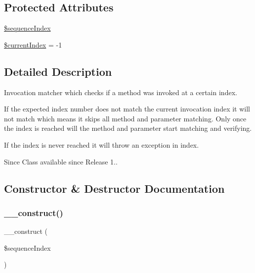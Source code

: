 \subsection*{Protected Attributes}
\begin{DoxyCompactItemize}
\item 
\mbox{\hyperlink{class_p_h_p_unit___framework___mock_object___matcher___invoked_at_index_ad1a376b0d5f560966a0fbf2ac6a57e33}{\$sequence\+Index}}
\item 
\mbox{\hyperlink{class_p_h_p_unit___framework___mock_object___matcher___invoked_at_index_a2c9d194ca07429b0b27d89f5efe150de}{\$current\+Index}} = -\/1
\end{DoxyCompactItemize}


\subsection{Detailed Description}
Invocation matcher which checks if a method was invoked at a certain index.

If the expected index number does not match the current invocation index it will not match which means it skips all method and parameter matching. Only once the index is reached will the method and parameter start matching and verifying.

If the index is never reached it will throw an exception in index.

\begin{DoxySince}{Since}
Class available since Release 1.. 
\end{DoxySince}


\subsection{Constructor \& Destructor Documentation}
\mbox{\label{class_p_h_p_unit___framework___mock_object___matcher___invoked_at_index_ac7f411a76ef452f4d11bd5657cedd730}} 
\subsubsection{\texorpdfstring{\+\_\+\+\_\+construct()}{\_\_construct()}}
{\footnotesize\ttfamily \+\_\+\+\_\+construct (\begin{DoxyParamCaption}\item[{}]{\$sequence\+Index }\end{DoxyParamCaption})}


